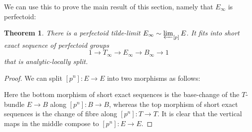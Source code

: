 \documentclass[10pt,oneside]{amsart}
\newtheorem{theorem}{Theorem}[section]
\theoremstyle{definition}
\begin{document}
	We can use this to prove the main result of this section, namely that $E_\infty$ is perfectoid:
	\begin{theorem}\label{p-F-formal tower exists for E}
		There is a perfectoid tilde-limit $E_\infty\sim \varprojlim_{[p]}E$. It fits into short exact sequence of perfectoid groups 
		\[1\to T_\infty\to E_\infty\to B_\infty\to 1\]
		that is analytic-locally split.
	\end{theorem}
	\begin{proof}
	We can split $[p^n]:E\to E$ into two morphisms as follows:
			\begin{center}
				\end{center}
			Here the bottom morphism of short exact sequences is the base-change of the $T$-bundle $E\to B$ along $[p^n]:B\to B$, whereas the top morphism of short exact sequences is the change of fibre along $[p^n]:T\to T$. It is clear that the vertical maps in the middle compose to $[p^n]:E\to E$.
			

\end{proof}
\end{document}
